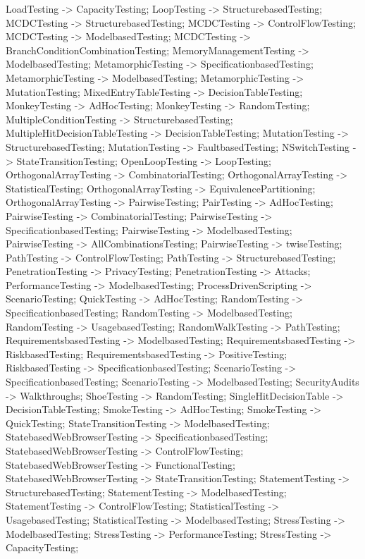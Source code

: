 \documentclass{article}
\begin{document}
{LoadTesting -> CapacityTesting;
LoopTesting -> StructurebasedTesting;
MCDCTesting -> StructurebasedTesting;
MCDCTesting -> ControlFlowTesting;
MCDCTesting -> ModelbasedTesting;
MCDCTesting -> BranchConditionCombinationTesting;
MemoryManagementTesting -> ModelbasedTesting;
MetamorphicTesting -> SpecificationbasedTesting;
MetamorphicTesting -> ModelbasedTesting;
MetamorphicTesting -> MutationTesting;
MixedEntryTableTesting -> DecisionTableTesting;
MonkeyTesting -> AdHocTesting;
MonkeyTesting -> RandomTesting;
MultipleConditionTesting -> StructurebasedTesting;
MultipleHitDecisionTableTesting -> DecisionTableTesting;
MutationTesting -> StructurebasedTesting;
MutationTesting -> FaultbasedTesting;
NSwitchTesting -> StateTransitionTesting;
OpenLoopTesting -> LoopTesting;
OrthogonalArrayTesting -> CombinatorialTesting;
OrthogonalArrayTesting -> StatisticalTesting;
OrthogonalArrayTesting -> EquivalencePartitioning;
OrthogonalArrayTesting -> PairwiseTesting;
PairTesting -> AdHocTesting;
PairwiseTesting -> CombinatorialTesting;
PairwiseTesting -> SpecificationbasedTesting;
PairwiseTesting -> ModelbasedTesting;
PairwiseTesting -> AllCombinationsTesting;
PairwiseTesting -> twiseTesting;
PathTesting -> ControlFlowTesting;
PathTesting -> StructurebasedTesting;
PenetrationTesting -> PrivacyTesting;
PenetrationTesting -> Attacks;
PerformanceTesting -> ModelbasedTesting;
ProcessDrivenScripting -> ScenarioTesting;
QuickTesting -> AdHocTesting;
RandomTesting -> SpecificationbasedTesting;
RandomTesting -> ModelbasedTesting;
RandomTesting -> UsagebasedTesting;
RandomWalkTesting -> PathTesting;
RequirementsbasedTesting -> ModelbasedTesting;
RequirementsbasedTesting -> RiskbasedTesting;
RequirementsbasedTesting -> PositiveTesting;
RiskbasedTesting -> SpecificationbasedTesting;
ScenarioTesting -> SpecificationbasedTesting;
ScenarioTesting -> ModelbasedTesting;
SecurityAudits -> Walkthroughs;
ShoeTesting -> RandomTesting;
SingleHitDecisionTable -> DecisionTableTesting;
SmokeTesting -> AdHocTesting;
SmokeTesting -> QuickTesting;
StateTransitionTesting -> ModelbasedTesting;
StatebasedWebBrowserTesting -> SpecificationbasedTesting;
StatebasedWebBrowserTesting -> ControlFlowTesting;
StatebasedWebBrowserTesting -> FunctionalTesting;
StatebasedWebBrowserTesting -> StateTransitionTesting;
StatementTesting -> StructurebasedTesting;
StatementTesting -> ModelbasedTesting;
StatementTesting -> ControlFlowTesting;
StatisticalTesting -> UsagebasedTesting;
StatisticalTesting -> ModelbasedTesting;
StressTesting -> ModelbasedTesting;
StressTesting -> PerformanceTesting;
StressTesting -> CapacityTesting;
}
\end{document}
